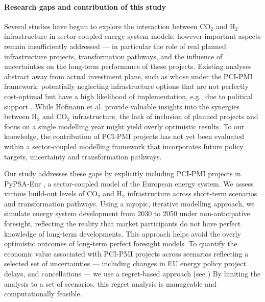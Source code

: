 \documentclass[pdflatex,sn-nature]{sn-jnl}%
\theoremstyle{thmstyleone}%
\theoremstyle{thmstyletwo}%
\theoremstyle{thmstylethree}%
\begin{document}
\paragraph{Research gaps and contribution of this study}
Several studies have begun to explore the interaction between CO$_2$ and H$_2$ infrastructure in sector-coupled energy system models, however important aspects remain insufficiently addressed --- in particular the role of real planned infrastructure projects, transformation pathways, and the influence of uncertainties on the long-term performance of these projects. Existing analyses abstract away from actual investment plans, such as whose under the PCI-PMI framework, potentially neglecting infrastructure options that are not perfectly cost-optimal but have a high likelihood of implementation, e.g., due to political support \cite{greevenbroekLittleLoseCase2024,trutnevyteDoesCostOptimization2016}. 
While Hofmann et al. \cite{hofmannH2CO2Network2025} provide valuable insights into the synergies between H$_2$ and CO$_2$ infrastructure, the lack of inclusion of planned projects and focus on a single modelling year might yield overly optimistic results. To our knowledge, the contribution of PCI-PMI projects has not yet been evaluated within a sector-coupled modelling framework that incorporates future policy targets, uncertainty and transformation pathways.

Our study addresses these gaps by explicitly including PCI-PMI projects in PyPSA-Eur \cite{horschPyPSAEurOpenOptimisation2018}, a sector-coupled model of the European energy system. We assess various build-out levels of CO$_2$ and H$_2$ infrastructure across short-term scenarios and transformation pathways. Using a myopic, iterative modelling approach, we simulate energy system development from 2030 to 2050 under non-anticipative foresight, reflecting the reality that market participants do not have perfect knowledge of long-term developments. This approach helps avoid the overly optimistic outcomes of long-term perfect foresight models. To quantify the economic value associated with PCI-PMI projects across scenarios reflecting a selected set of uncertainties --- including changes in EU energy policy project delays, and cancellations --- we use a regret-based approach (see ) By limiting the analysis to a set of scenarios, this regret analysis is manageable and computationally feasible.
\end{document}
